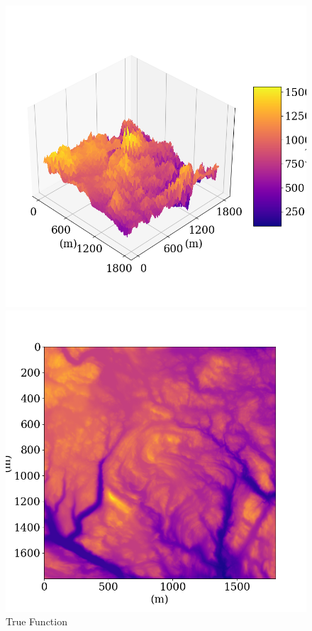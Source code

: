 \documentclass[twoside,11pt]{report}
\begin{document}
\begin{figure}[!h]
\begin{minipage}[!t]{.48\linewidth}
    \begin{center}
        \includegraphics[width=1.0\textwidth]{../runsAndAdditions/realdata3D.png}
        \caption{True Function}\label{fig:realdata3D}
\end{center}
\end{minipage}
\hspace{2mm}
\begin{minipage}[!t]{.48\linewidth}
    \begin{center}
        \includegraphics[width=1.0\textwidth]{../runsAndAdditions/realdataMap.png}

\end{center}
\end{minipage}
\end{figure}
\end{document}
